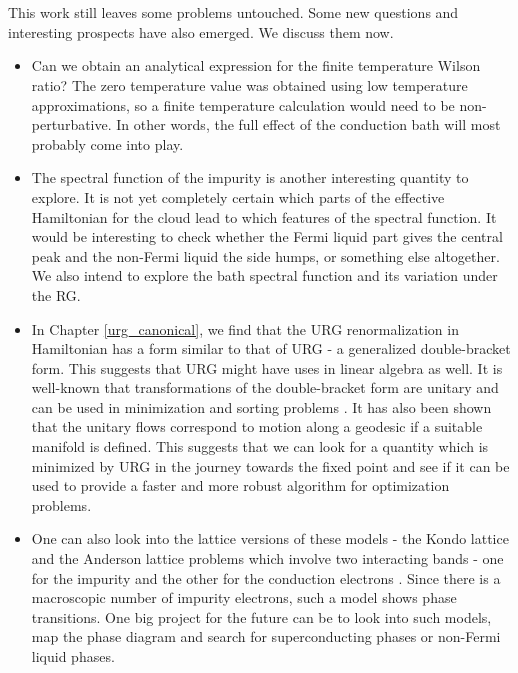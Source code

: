 \documentclass[twoside]{report}
\numberwithin{equation}{section}
\begin{document}
\\\\This work still leaves some problems untouched. Some new questions and interesting prospects have also emerged. We discuss them now.
\begin{itemize}
	\item Can we obtain an analytical expression for the finite temperature Wilson ratio? The zero temperature value was obtained using low temperature approximations, so a finite temperature calculation would need to be non-perturbative. In other words, the full effect of the conduction bath will most probably come into play.
	\item The spectral function of the impurity is another interesting quantity to explore. It is not yet completely certain which parts of the effective Hamiltonian for the cloud lead to which features of the spectral function. It would be interesting to check whether the Fermi liquid part gives the central peak and the non-Fermi liquid the side humps, or something else altogether. We also intend to explore the bath spectral function and its variation under the RG.
	\item In Chapter \ref{urg_canonical}, we find that the URG renormalization in Hamiltonian has a form similar to that of URG - a generalized double-bracket form. This suggests that URG might have uses in linear algebra as well. It is well-known that transformations of the double-bracket form are unitary and can be used in minimization and sorting problems \cite{Brockett1991}. It has also been shown that the unitary flows correspond to motion along a geodesic if a suitable manifold is defined. This suggests that we can look for a quantity which is minimized by URG in the journey towards the fixed point and see if it can be used to provide a faster and more robust algorithm for optimization problems.
	\item One can also look into the lattice versions of these models - the Kondo lattice and the Anderson lattice problems which involve two interacting bands - one for the impurity and the other for the conduction electrons \cite{gulacsi}. Since there is a macroscopic number of impurity electrons, such a model shows phase transitions. One big project for the future can be to look into such models, map the phase diagram and search for superconducting phases or non-Fermi liquid phases.

\end{itemize}
\end{document}

